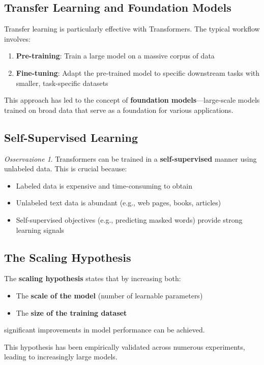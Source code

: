 \documentclass[11pt,a4paper]{article}
\theoremstyle{definition}
\theoremstyle{plain}
\theoremstyle{remark}
\newtheorem*{observation}{Osservazione}
\begin{document}
\subsection{Transfer Learning and Foundation Models}

\begin{tcolorbox}[colback=yellow!10!white,colframe=yellow!75!black,title=\textbf{Transfer Learning with Transformers}]
Transfer learning is particularly effective with Transformers. The typical workflow involves:
\begin{enumerate}
    \item \textbf{Pre-training}: Train a large model on a massive corpus of data
    \item \textbf{Fine-tuning}: Adapt the pre-trained model to specific downstream tasks with smaller, task-specific datasets
\end{enumerate}

This approach has led to the concept of \textbf{foundation models}—large-scale models trained on broad data that serve as a foundation for various applications.
\end{tcolorbox}

\subsection{Self-Supervised Learning}

\begin{observation}
Transformers can be trained in a \textbf{self-supervised} manner using unlabeled data. This is crucial because:
\begin{itemize}
    \item Labeled data is expensive and time-consuming to obtain
    \item Unlabeled text data is abundant (e.g., web pages, books, articles)
    \item Self-supervised objectives (e.g., predicting masked words) provide strong learning signals
\end{itemize}
\end{observation}

\subsection{The Scaling Hypothesis}

\begin{tcolorbox}[colback=teal!10!white,colframe=teal!75!black,title=\textbf{Scaling Hypothesis}]
The \textbf{scaling hypothesis} states that by increasing both:
\begin{itemize}
    \item The \textbf{scale of the model} (number of learnable parameters)
    \item The \textbf{size of the training dataset}
\end{itemize}
significant improvements in model performance can be achieved.

This hypothesis has been empirically validated across numerous experiments, leading to increasingly large models.
\end{tcolorbox}
\end{document}
